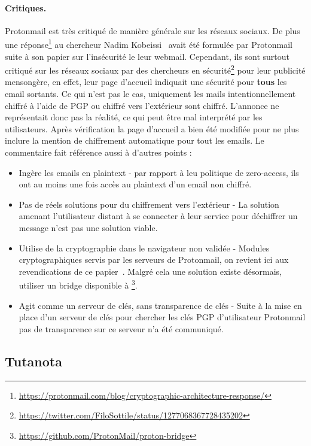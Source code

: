 \paragraph*{Critiques.}
Protonmail est très critiqué de manière générale sur les réseaux sociaux. De plus une réponse\footnote{\url{https://protonmail.com/blog/cryptographic-architecture-response/}} au chercheur Nadim Kobeissi~\cite{DBLP:journals/iacr/Kobeissi18a} avait été formulée par Protonmail suite à son papier sur l'insécurité le leur webmail. Cependant, ils sont surtout critiqué sur les réseaux sociaux par des chercheurs en sécurité\footnote{\url{https://twitter.com/FiloSottile/status/1277068367728435202}} pour leur publicité mensongère, en effet, leur page d'accueil indiquait une sécurité pour \textbf{tous} les email sortants. Ce qui n'est pas le cas, uniquement les mails intentionnellement chiffré à l'aide de PGP ou chiffré vers l'extérieur sont chiffré. L'annonce ne représentait donc pas la réalité, ce qui peut être mal interprété par les utilisateurs. Après vérification la page d'accueil a bien été modifiée pour ne plus inclure la mention de chiffrement automatique pour tout les emails. Le commentaire fait référence aussi à d'autres points :
\begin{itemize}
	\item Ingère les emails en plaintext - par rapport à leu politique de zero-access, ils ont au moins une fois accès au plaintext d'un email non chiffré.
	\item Pas de réels solutions pour du chiffrement vers l'extérieur - La solution amenant l'utilisateur distant à se connecter à leur service pour déchiffrer un message n'est pas une solution viable.
	\item Utilise de la cryptographie dans le navigateur non validée - Modules cryptographiques servis par les serveurs de Protonmail, on revient ici aux revendications de ce papier~\cite{DBLP:journals/iacr/Kobeissi18a}. Malgré cela une solution existe désormais, utiliser un bridge disponible à \footnote{\url{https://github.com/ProtonMail/proton-bridge}}.
	\item Agit comme un serveur de clés, sans transparence de clés - Suite à la mise en place d'un serveur de clés pour chercher les clés PGP d'utilisateur Protonmail pas de transparence sur ce serveur n'a été communiqué.
\end{itemize}
\subsection{Tutanota}
